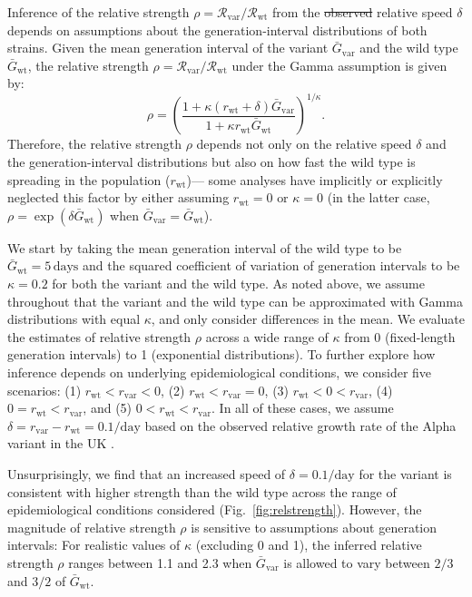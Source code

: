 \documentclass[12pt]{article}
\newcommand{\fref}[1]{Fig.~\ref{fig:#1}}
\newcommand{\vvvar}{\mathrm{var}}
\newcommand{\wwwt}{\mathrm{wt}}
\newcommand{\rx}[1]{\ensuremath{{r}_{#1}}\xspace}
\newcommand{\rw}{\rx{\wwwt}}
\newcommand{\rv}{\rx{\vvvar}}
\newcommand{\Rx}[1]{\ensuremath{{\mathcal R}_{#1}}\xspace}
\newcommand{\Rw}{\Rx{\wwwt}}
\newcommand{\Rv}{\Rx{\vvvar}}
\newcommand{\days}{\ensuremath{\, \textrm{days}}}
\newcommand{\pday}{\ensuremath{/\textrm{day}}}
\newcommand{\Gx}[1]{\ensuremath{{\bar G}_{#1}}\xspace}
\newcommand{\Gw}{\Gx{\wwwt}}
\newcommand{\Gv}{\Gx{\vvvar}}
\providecommand{\DIFdeltex}[1]{{\protect\color{red}\sout{#1}}}                      %
\providecommand{\DIFdelbegin}{} %
\providecommand{\DIFdelend}{} %
\providecommand{\DIFdel}[1]{\texorpdfstring{\DIFdeltex{#1}}{}} %
\newcommand{\DIFscaledelfig}{0.5}
\newlength{\DIFdelgraphicswidth} %
\newlength{\DIFdelgraphicsheight} %
\newcommand{\DIFdelincludegraphics}[2][]{%
\sbox{\DIFdelgraphicsbox}{\DIFOincludegraphics[#1]{#2}}%
\settoboxwidth{\DIFdelgraphicswidth}{\DIFdelgraphicsbox} %
\settoboxtotalheight{\DIFdelgraphicsheight}{\DIFdelgraphicsbox} %
\scalebox{\DIFscaledelfig}{%
\parbox[b]{\DIFdelgraphicswidth}{\usebox{\DIFdelgraphicsbox}\\[-\baselineskip] \rule{\DIFdelgraphicswidth}{0em}}\llap{\resizebox{\DIFdelgraphicswidth}{\DIFdelgraphicsheight}{%
\setlength{\unitlength}{\DIFdelgraphicswidth}%
\begin{picture}(1,1)%
\thicklines\linethickness{2pt} %
{\color[rgb]{1,0,0}\put(0,0){\framebox(1,1){}}}%
{\color[rgb]{1,0,0}\put(0,0){\line( 1,1){1}}}%
{\color[rgb]{1,0,0}\put(0,1){\line(1,-1){1}}}%
\end{picture}%
}\hspace*{3pt}}} %
} %
\DeclareRobustCommand{\DIFdelbegin}{\DIFOdelbegin \let\includegraphics\DIFdelincludegraphics} %
\DeclareRobustCommand{\DIFdelend}{\DIFOaddend \let\includegraphics\DIFOincludegraphics} %
\begin{document}
Inference of the relative strength $\rho = \Rv/\Rw$ from the \DIFdelbegin \DIFdel{observed }\DIFdelend relative speed $\delta$ depends on assumptions about the generation-interval distributions of both strains.
Given the mean generation interval of the variant $\Gv$ and the wild type $\Gw$, the relative strength $\rho = \Rv/\Rw$ under the Gamma assumption \citep{park2019practical} is given by:
\begin{equation}
\rho = \left(\frac{1 + \kappa (\rw + \delta) \Gv}{1 + \kappa \rw \Gw}\right)^{1/\kappa}.
\end{equation}
Therefore, the relative strength $\rho$ depends not only on the relative speed $\delta$ and the generation-interval distributions but also on how fast the wild type is spreading in the population (\rw)---
some analyses have implicitly or explicitly neglected this factor by either assuming $\rw = 0$ \citep{switzerland2021variant} or $\kappa = 0$ \citep{davies2021estimated} (in the latter case, $\rho = \exp(\delta \Gw)$ when $\Gv=\Gw$).

We start by taking the mean generation interval of the wild type to be $\Gw = 5\days$ \citep{ferretti2020quantifying} and the squared coefficient of variation of generation intervals to be $\kappa=0.2$ \citep{ferretti2020quantifying} for both the variant and the wild type.
As noted above, we assume throughout that the variant and the wild type can be approximated with Gamma distributions with equal $\kappa$, and only consider differences in the mean.
We evaluate the estimates of relative strength $\rho$ across a wide range of $\kappa$ from 0 (fixed-length generation intervals) to 1 (exponential distributions).
To further explore how inference depends on underlying epidemiological conditions, we consider five scenarios: (1) $\rw < \rv < 0$, (2) $\rw < \rv = 0$, (3) $\rw < 0 < \rv$, (4) $0 = \rw < \rv$, and (5) $0 < \rw < \rv$.
In all of these cases, we assume $\delta = \rv - \rw = 0.1\pday$ based on the observed relative growth rate of the Alpha variant in the UK \citep{davies2021estimated}.

Unsurprisingly, we find that an increased speed of $\delta=0.1\pday$ for the variant is consistent with higher strength than the wild type across the range of epidemiological conditions considered (\fref{relstrength}).
However, the magnitude of relative strength $\rho$ is sensitive to assumptions about generation intervals:
For realistic values of $\kappa$ (excluding 0 and 1), the inferred relative strength $\rho$ ranges between 1.1 and 2.3 when $\Gv$ is allowed to vary between $2/3$ and $3/2$ of \Gw.
\end{document}
